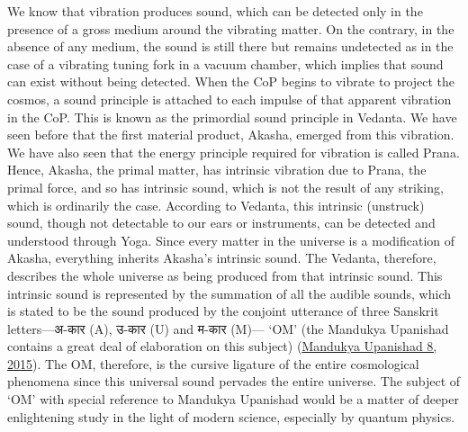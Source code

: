 \documentclass[twoside, 13pt]{article}
\begin{document}
{{\fontsize{12}{14}\selectfont We know that vibration produces sound, which can be detected only in the presence of a gross medium around the vibrating matter. On the contrary, in the absence of any medium, the sound is still there but remains undetected as in the case of a vibrating tuning fork in a vacuum chamber, which implies that sound can exist without being detected. When the CoP begins to vibrate to project the cosmos, a sound principle is attached to each impulse of that apparent vibration in the CoP. This is known as the primordial sound principle in Vedanta. We have seen before that the first material product, Akasha, emerged from this vibration. We have also seen that the energy principle required for vibration is called Prana. Hence, Akasha, the primal matter, has intrinsic vibration due to Prana, the primal force, and so has intrinsic sound, which is not the result of any striking, which is ordinarily the case. According to Vedanta, this intrinsic (unstruck) sound, though not detectable to our ears or instruments, can be detected and understood through Yoga. Since every matter in the universe is a modification of Akasha, everything inherits Akasha’s intrinsic sound. The Vedanta, therefore, describes the whole universe as being produced from that intrinsic sound. This intrinsic sound is represented by the summation of all the audible sounds, which is stated to be the sound produced by the conjoint utterance of three Sanskrit letters—\foreignlanguage{hindi}{{\fontsize{9}{11}\selectfont अ-कार }}(A), \foreignlanguage{hindi}{{\fontsize{9}{11}\selectfont उ-कार }}(U) and \foreignlanguage{hindi}{{\fontsize{9}{11}\selectfont म-कार}} (M)— ‘OM’ (the Mandukya Upanishad contains a great deal of elaboration on this subject) (\underline{Mandukya Upanishad 8, 2015}). The OM, therefore, is the cursive ligature of the entire cosmological phenomena since this universal sound pervades the entire universe. The subject of ‘OM’ with special reference to Mandukya Upanishad would be a matter of deeper enlightening study in the light of modern science, especially by quantum physics. }

}
\end{document}
